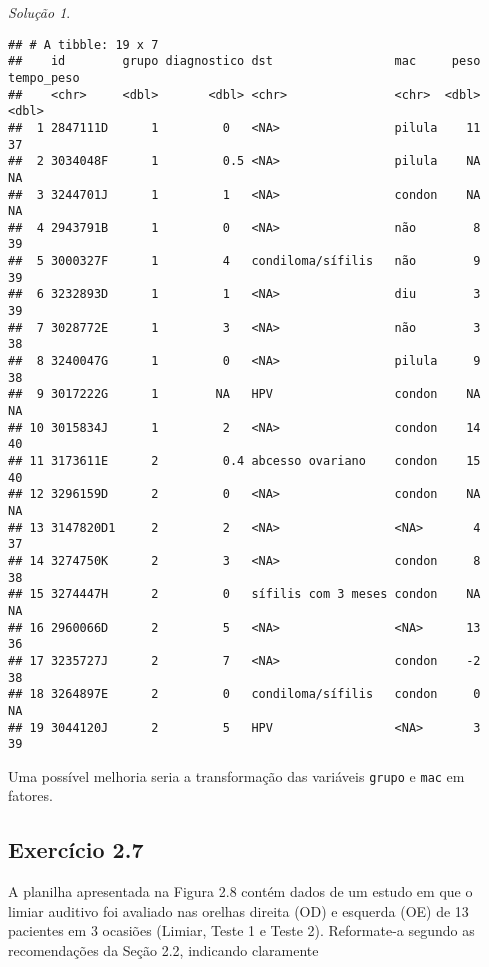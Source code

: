 \documentclass[
]{latex/krantz}
\theoremstyle{definition}
\theoremstyle{definition}
\theoremstyle{definition}
\theoremstyle{definition}
\theoremstyle{remark}
\newtheorem*{solution}{Solução}
\begin{document}
\begin{solution}
\begin{verbatim}
## # A tibble: 19 x 7
##    id        grupo diagnostico dst                 mac     peso tempo_peso
##    <chr>     <dbl>       <dbl> <chr>               <chr>  <dbl>      <dbl>
##  1 2847111D      1         0   <NA>                pilula    11         37
##  2 3034048F      1         0.5 <NA>                pilula    NA         NA
##  3 3244701J      1         1   <NA>                condon    NA         NA
##  4 2943791B      1         0   <NA>                não        8         39
##  5 3000327F      1         4   condiloma/sífilis   não        9         39
##  6 3232893D      1         1   <NA>                diu        3         39
##  7 3028772E      1         3   <NA>                não        3         38
##  8 3240047G      1         0   <NA>                pilula     9         38
##  9 3017222G      1        NA   HPV                 condon    NA         NA
## 10 3015834J      1         2   <NA>                condon    14         40
## 11 3173611E      2         0.4 abcesso ovariano    condon    15         40
## 12 3296159D      2         0   <NA>                condon    NA         NA
## 13 3147820D1     2         2   <NA>                <NA>       4         37
## 14 3274750K      2         3   <NA>                condon     8         38
## 15 3274447H      2         0   sífilis com 3 meses condon    NA         NA
## 16 2960066D      2         5   <NA>                <NA>      13         36
## 17 3235727J      2         7   <NA>                condon    -2         38
## 18 3264897E      2         0   condiloma/sífilis   condon     0         NA
## 19 3044120J      2         5   HPV                 <NA>       3         39
\end{verbatim}

Uma possível melhoria seria a transformação das variáveis \texttt{grupo} e \texttt{mac} em fatores.
\end{solution}

\hypertarget{exr2-7}{%
\subsection*{Exercício 2.7}\label{exr2-7}}

A planilha apresentada na Figura 2.8 contém dados de um estudo em que o limiar auditivo foi avaliado nas orelhas direita (OD) e esquerda (OE) de 13 pacientes em 3 ocasiões (Limiar, Teste 1 e Teste 2). Reformate-a segundo as recomendações da Seção 2.2, indicando claramente
\end{document}
